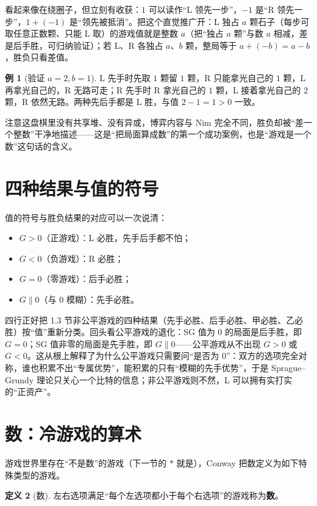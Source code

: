 \documentclass[UTF8,a4paper,11pt,oneside,openany,fontset=fandol]{ctexbook}
\theoremstyle{definition}
\newtheorem{definition}{定义}[chapter]
\newtheorem{example}[definition]{例}
\begin{document}
看起来像在绕圈子，但立刻有收获：$1$ 可以读作“L 领先一步”，$-1$ 是“R 领先一步”，$1+(-1)$ 是“领先被抵消”。把这个直觉推广开：L 独占 $a$ 颗石子（每步可取任意正数颗、只能 L 取）的游戏值就是整数 $a$（把“独占 $a$ 颗”与数 $a$ 相减，差是后手胜，可归纳验证）；若 L、R 各独占 $a$、$b$ 颗，整局等于 $a+(-b)=a-b$，胜负只看差值。

\begin{example}[验证 $a=2,b=1$]
L 先手时先取 $1$ 颗留 $1$ 颗，R 只能拿光自己的 $1$ 颗，L 再拿光自己的，R 无路可走；R 先手时 R 拿光自己的 $1$ 颗，L 接着拿光自己的 $2$ 颗，R 依然无路。两种先后手都是 L 胜，与值 $2-1=1>0$ 一致。
\end{example}

注意这盘棋里没有共享堆、没有异或，博弈内容与 Nim 完全不同，胜负却被“差一个整数”干净地描述——这是“把局面算成数”的第一个成功案例，也是“游戏是一个数”这句话的含义。

\section{四种结果与值的符号}
值的符号与胜负结果的对应可以一次说清：
\begin{itemize}
\item $G>0$（正游戏）：L 必胜，先手后手都不怕；
\item $G<0$（负游戏）：R 必胜；
\item $G=0$（零游戏）：后手必胜；
\item $G\parallel 0$（与 $0$ 模糊）：先手必胜。
\end{itemize}
四行正好把 1.3 节非公平游戏的四种结果（先手必胜、后手必胜、甲必胜、乙必胜）按“值”重新分类。回头看公平游戏的退化：SG 值为 $0$ 的局面是后手胜，即 $G=0$；SG 值非零的局面是先手胜，即 $G\parallel0$——公平游戏从不出现 $G>0$ 或 $G<0$。这从根上解释了为什么公平游戏只需要问“是否为 $0$”：双方的选项完全对称，谁也积累不出“专属优势”，能积累的只有“模糊的先手优势”，于是 Sprague--Grundy 理论只关心一个比特的信息；非公平游戏则不然，L 可以拥有实打实的“正资产”。

\section{数：冷游戏的算术}
游戏世界里存在“不是数”的游戏（下一节的 $\ast$ 就是），Conway 把数定义为如下特殊类型的游戏。

\begin{definition}[数]
左右选项满足“每个左选项都小于每个右选项”的游戏称为\textbf{数}。
\end{definition}
\end{document}
